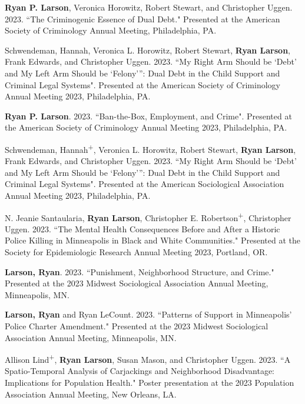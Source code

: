 \documentclass[letterpaper]{article}
\renewenvironment{itemize}{
  \begin{list}{}{
    \setlength{\leftmargin}{1.5em}
  }
}{
  \end{list}
}
\begin{document}
\begin{itemize}
\item \textbf{Ryan P. Larson}, Veronica Horowitz, Robert Stewart, and Christopher Uggen. 2023. ``The Criminogenic Essence of Dual Debt." Presented at the American Society of Criminology Annual Meeting, Philadelphia, PA. 

\item Schwendeman, Hannah, Veronica L. Horowitz, Robert Stewart, \textbf{Ryan Larson}, Frank Edwards, and Christopher Uggen. 2023. ``My Right Arm Should be ‘Debt’ and My Left Arm Should be ‘Felony’”:
Dual Debt in the Child Support and Criminal Legal Systems". Presented at the American Society of Criminology Annual Meeting 2023, Philadelphia, PA. 

\item \textbf{Ryan P. Larson}. 2023. ``Ban-the-Box, Employment, and Crime". Presented at the American Society of Criminology Annual Meeting 2023, Philadelphia, PA. 

\item Schwendeman, Hannah\textsuperscript{+}, Veronica L. Horowitz, Robert Stewart, \textbf{Ryan Larson}, Frank Edwards, and Christopher Uggen. 2023. ``My Right Arm Should be ‘Debt’ and My Left Arm Should be ‘Felony’”:
Dual Debt in the Child Support and Criminal Legal Systems". Presented at the American Sociological Association Annual Meeting 2023, Philadelphia, PA. 

\item N. Jeanie Santaularia, \textbf{Ryan Larson}, Christopher E. Robertson\textsuperscript{+}, Christopher Uggen. 2023. ``The Mental Health Consequences Before and After a Historic Police Killing in Minneapolis in Black and White Communities." Presented at the Society for Epidemiologic Research Annual Meeting 2023, Portland, OR.

\item \textbf{Larson, Ryan}. 2023. ``Punishment, Neighborhood Structure, and Crime." Presented at the 2023 Midwest Sociological Association Annual Meeting, Minneapolis, MN. 

\item \textbf{Larson, Ryan} and Ryan LeCount. 2023. ``Patterns of Support in Minneapolis’ Police Charter Amendment." Presented at the 2023 Midwest Sociological Association Annual Meeting, Minneapolis, MN. 

\item Allison Lind\textsuperscript{+}, \textbf{Ryan Larson}, Susan Mason, and Christopher Uggen. 2023. ``A Spatio-Temporal Analysis of Carjackings and Neighborhood Disadvantage: Implications for Population Health." Poster presentation at the 2023 Population Association Annual Meeting, New Orleans, LA. 


\end{itemize}
\end{document}
